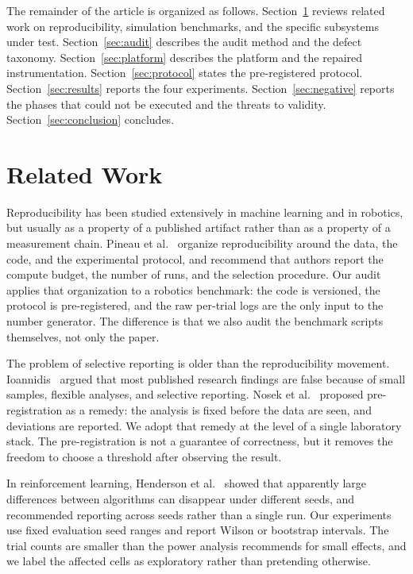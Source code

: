 \documentclass[journal]{IEEEtran}
\begin{document}
The remainder of the article is organized as follows. Section~\ref{sec:related} reviews related work on reproducibility, simulation benchmarks, and the specific subsystems under test. Section~\ref{sec:audit} describes the audit method and the defect taxonomy. Section~\ref{sec:platform} describes the platform and the repaired instrumentation. Section~\ref{sec:protocol} states the pre-registered protocol. Section~\ref{sec:results} reports the four experiments. Section~\ref{sec:negative} reports the phases that could not be executed and the threats to validity. Section~\ref{sec:conclusion} concludes.

\section{Related Work}
\label{sec:related}
Reproducibility has been studied extensively in machine learning and in robotics, but usually as a property of a published artifact rather than as a property of a measurement chain. Pineau et al.~\cite{pineau2021improving} organize reproducibility around the data, the code, and the experimental protocol, and recommend that authors report the compute budget, the number of runs, and the selection procedure. Our audit applies that organization to a robotics benchmark: the code is versioned, the protocol is pre-registered, and the raw per-trial logs are the only input to the number generator. The difference is that we also audit the benchmark scripts themselves, not only the paper.

The problem of selective reporting is older than the reproducibility movement. Ioannidis~\cite{ioannidis2005why} argued that most published research findings are false because of small samples, flexible analyses, and selective reporting. Nosek et al.~\cite{nosek2018prereg} proposed pre-registration as a remedy: the analysis is fixed before the data are seen, and deviations are reported. We adopt that remedy at the level of a single laboratory stack. The pre-registration is not a guarantee of correctness, but it removes the freedom to choose a threshold after observing the result.

In reinforcement learning, Henderson et al.~\cite{henderson2018deep} showed that apparently large differences between algorithms can disappear under different seeds, and recommended reporting across seeds rather than a single run. Our experiments use fixed evaluation seed ranges and report Wilson or bootstrap intervals. The trial counts are smaller than the power analysis recommends for small effects, and we label the affected cells as exploratory rather than pretending otherwise.
\end{document}
